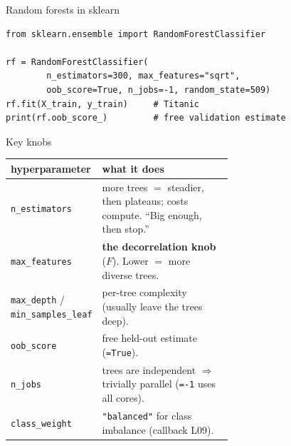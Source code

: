 \documentclass[aspectratio=169]{beamer}
\begin{document}
\begin{frame}[fragile]{Random forests in sklearn}
\begin{lstlisting}
from sklearn.ensemble import RandomForestClassifier

rf = RandomForestClassifier(
        n_estimators=300, max_features="sqrt",
        oob_score=True, n_jobs=-1, random_state=509)
rf.fit(X_train, y_train)     # Titanic
print(rf.oob_score_)         # free validation estimate
\end{lstlisting}
  \vfill
\end{frame}

\begin{frame}{Key knobs}
  \begin{center}\footnotesize
    \renewcommand{\arraystretch}{1.2}
    \begin{tabular}{l p{0.62\linewidth}}
      hyperparameter & what it does \\
      \hline
      \texttt{n\_estimators} & more trees $=$ steadier, then plateaus; costs compute. ``Big enough, then stop.'' \\
      \texttt{max\_features} & \textbf{the decorrelation knob} ($F$). Lower $=$ more diverse trees. \\
      \texttt{max\_depth} / \texttt{min\_samples\_leaf} & per-tree complexity (usually leave the trees deep). \\
      \texttt{oob\_score} & free held-out estimate (\texttt{=True}). \\
      \texttt{n\_jobs} & trees are independent $\Rightarrow$ trivially parallel (\texttt{=-1} uses all cores). \\
      \texttt{class\_weight} & \texttt{"balanced"} for class imbalance (callback L09). \\
      \hline
    \end{tabular}
  \end{center}
  \vfill
\end{frame}
\end{document}
